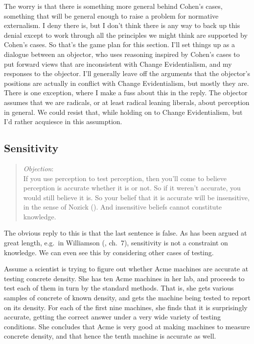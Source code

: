 \documentclass[
  10pt,
  letterpaper,
  twoside]{scrbook}
\begin{document}
The worry is that there is something more general behind Cohen's cases,
something that will be general enough to raise a problem for normative
externalism. I deny there is, but I don't think there is any way to back
up this denial except to work through all the principles we might think
are supported by Cohen's cases. So that's the game plan for this
section. I'll set things up as a dialogue between an objector, who uses
reasoning inspired by Cohen's cases to put forward views that are
inconsistent with Change Evidentialism, and my responses to the
objector. I'll generally leave off the arguments that the objector's
positions are actually in conflict with Change Evidentialism, but mostly
they are. There is one exception, where I make a fuss about this in the
reply. The objector assumes that we are radicals, or at least radical
leaning liberals, about perception in general. We could resist that,
while holding on to Change Evidentialism, but I'd rather acquiesce in
this assumption.

\subsection{Sensitivity}\label{sensitivity}

\begin{quote}
\emph{Objection}:\\
If you use perception to test perception, then you'll come to believe
perception is accurate whether it is or not. So if it weren't accurate,
you would still believe it is. So your belief that it is accurate will
be insensitive, in the sense of Nozick
(). And insensitive beliefs cannot
constitute knowledge.
\end{quote}

The obvious reply to this is that the last sentence is false. As has
been argued at great length, e.g.~in Williamson
(, ch.~7), sensitivity is not a
constraint on knowledge. We can even see this by considering other cases
of testing.

Assume a scientist is trying to figure out whether Acme machines are
accurate at testing concrete density. She has ten Acme machines in her
lab, and proceeds to test each of them in turn by the standard methods.
That is, she gets various samples of concrete of known density, and gets
the machine being tested to report on its density. For each of the first
nine machines, she finds that it is surprisingly accurate, getting the
correct answer under a very wide variety of testing conditions. She
concludes that Acme is very good at making machines to measure concrete
density, and that hence the tenth machine is accurate as well.
\end{document}
